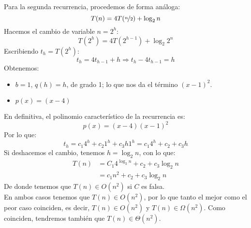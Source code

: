 \documentclass[12pt]{article}
\begin{document}
\begin{ejercicio}[2 puntos]
        \noindent
        Para la segunda recurrencia, procedemos de forma análoga:
        \begin{equation*}
            T(n) = 4T(\nicefrac{n}{2}) + \log_2n
        \end{equation*}
        Hacemos el cambio de variable $n = 2^h$:
        \begin{equation*}
            T\left(2^h\right) = 4T\left(2^{h-1}\right) + \log_2 2^n
        \end{equation*}
        Escribiendo $t_h = T\left(2^h\right)$:
        \begin{equation*}
            t_h = 4t_{h-1}+h \Longrightarrow t_h - 4t_{h-1} = h
        \end{equation*}
        Obtenemos:
        \begin{itemize}
            \item $b=1$, $q(h) = h$, de grado 1; lo que nos da el término ${(x-1)}^{2}$.
            \item $p(x) = (x-4)$
        \end{itemize}
        En definitiva, el polinomio característico de la recurrencia es:
        \begin{equation*}
            p(x) = (x-4){(x-1)}^{2}
        \end{equation*}
        Por lo que:
        \begin{equation*}
            t_h = c_1 4^h + c_2 1^h + c_3 h1^h = c_1 4^h + c_2 + c_3h
        \end{equation*}
        Si deshacemos el cambio, tenemos $h = \log_2n$, con lo que:
        \begin{align*}
            T(n) &= C_1 4^{\log_2n} + c_2 + c_3\log_2n \\
                 &= c_1 n^2 + c_2 + c_3 \log_2n
        \end{align*}
        De donde tenemos que $T(n)\in O(n^2)$ si $C$ es falsa.\\

        \noindent
        En ambos casos tenemos que $T(n) \in O(n^2)$, por lo que tanto el mejor como el peor caso coinciden, es decir, $T(n) \in O(n^2)$ y $T(n) \in \Omega(n^2)$. Como coinciden, tendremos también que $T(n) \in \Theta(n^2)$.
    \end{ejercicio}
    
\end{document}
